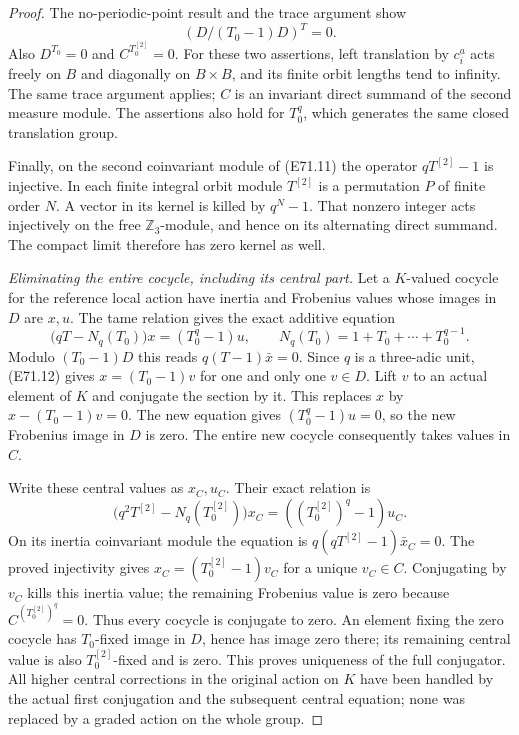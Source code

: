\begin{proof}
The no-periodic-point result and the trace
argument show
\[
     \left(D/(T_0-1)D\right)^T=0 .
 \tag{E71.12}
\]
Also $D^{T_0}=0$ and $C^{T_0^{[2]}}=0$.
For these two assertions, left translation by
$c_i^a$ acts freely on $B$ and diagonally on
$B\times B$, and its finite orbit lengths tend
to infinity. The same trace argument applies;
$C$ is an invariant direct summand of the
second measure module. The assertions also
hold for $T_0^q$, which generates the same
closed translation group.

Finally, on the second coinvariant module of
(E71.11) the operator $qT^{[2]}-1$ is injective.
In each finite integral orbit module $T^{[2]}$
is a permutation $P$ of finite order $N$. A
vector in its kernel is killed by $q^N-1$.
That nonzero integer acts injectively on the
free $\mathbb Z_3$-module, and hence on its
alternating direct summand. The compact limit
therefore has zero kernel as well.

\emph{Eliminating the entire cocycle, including its central part.}
Let a $K$-valued cocycle for the reference
local action have inertia and Frobenius values
whose images in $D$ are $x,u$. The tame
relation gives the exact additive equation
\[
       \bigl(qT-N_q(T_0)\bigr)x
                            =(T_0^q-1)u,
       \qquad N_q(T_0)=1+T_0+\cdots+T_0^{q-1}.
 \tag{E71.13}
\]
Modulo $(T_0-1)D$ this reads $q(T-1)\bar x=0$.
Since $q$ is a three-adic unit, (E71.12) gives
$x=(T_0-1)v$ for one and only one $v\in D$.
Lift $v$ to an actual element of $K$ and
conjugate the section by it. This replaces
$x$ by $x-(T_0-1)v=0$.
The new equation gives $(T_0^q-1)u=0$, so
the new Frobenius image in $D$ is zero.
The entire new cocycle consequently takes
values in $C$.

Write these central values as $x_C,u_C$.
Their exact relation is
\[
 \bigl(q^2T^{[2]}-N_q(T_0^{[2]})\bigr)x_C
                       =((T_0^{[2]})^q-1)u_C.
 \tag{E71.14}
\]
On its inertia coinvariant module the equation
is $q(qT^{[2]}-1)\bar x_C=0$.
The proved injectivity gives
$x_C=(T_0^{[2]}-1)v_C$ for a unique $v_C\in C$.
Conjugating by $v_C$ kills this inertia value;
the remaining Frobenius value is zero because
$C^{(T_0^{[2]})^q}=0$.
Thus every cocycle is conjugate to zero.
An element fixing the zero cocycle has
$T_0$-fixed image in $D$, hence has image
zero there; its remaining central value is
also $T_0^{[2]}$-fixed and is zero.
This proves uniqueness of the full conjugator.
All higher central corrections in the original
action on $K$ have been handled by the actual
first conjugation and the subsequent central
equation; none was replaced by a graded action
on the whole group.


\end{proof}
